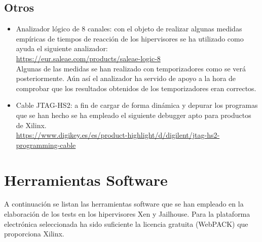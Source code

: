 \subsection{Otros}

\begin{itemize}
  \item Analizador lógico de 8 canales: con el objeto de realizar algunas medidas empíricas de tiempos de reacción de los hipervisores se ha utilizado como ayuda el siguiente analizador:\\
  \url{https://eur.saleae.com/products/saleae-logic-8}
  \\Algunas de las medidas se han realizado con temporizadores como se verá posteriormente. Aún así el analizador ha servido de apoyo a la hora de comprobar que los resultados obtenidos de los temporizadores eran correctos.
  \item Cable JTAG-HS2: a fin de cargar de forma dinámica y depurar los programas que se han hecho se ha empleado el siguiente debugger apto para productos de Xilinx.\\

  \url{https://www.digikey.es/es/product-highlight/d/digilent/jtag-hs2-programming-cable}
\end{itemize}

\section{Herramientas Software}

A continuación se listan las herramientas software que se han empleado en la elaboración de los tests en los hipervisores Xen y Jailhouse. Para la plataforma electrónica seleccionada ha sido suficiente la licencia gratuita (WebPACK) que proporciona Xilinx.

